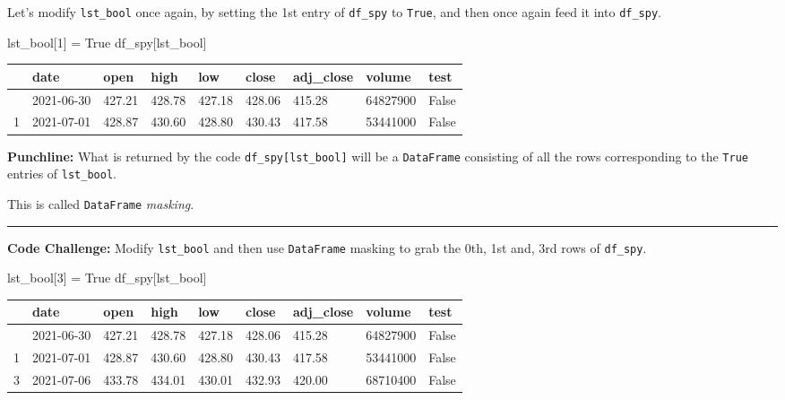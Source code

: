 \documentclass[
  letterpaper,
  DIV=11,
  numbers=noendperiod]{scrreprt}
\newenvironment{Shaded}{\begin{snugshade}}{\end{snugshade}}
\newcommand{\DecValTok}[1]{\textcolor[rgb]{0.68,0.00,0.00}{#1}}
\newcommand{\NormalTok}[1]{\textcolor[rgb]{0.00,0.23,0.31}{#1}}
\newcommand{\OperatorTok}[1]{\textcolor[rgb]{0.37,0.37,0.37}{#1}}
\newcommand{\VariableTok}[1]{\textcolor[rgb]{0.07,0.07,0.07}{#1}}
\begin{document}
Let's modify \texttt{lst\_bool} once again, by setting the 1st entry of
\texttt{df\_spy} to \texttt{True}, and then once again feed it into
\texttt{df\_spy}.

\begin{Shaded}
\begin{Highlighting}[]
\NormalTok{lst\_bool[}\DecValTok{1}\NormalTok{] }\OperatorTok{=} \VariableTok{True}
\NormalTok{df\_spy[lst\_bool]}
\end{Highlighting}
\end{Shaded}

\begin{longtable}[]{@{}lllllllll@{}}
\toprule\noalign{}
& date & open & high & low & close & adj\_close & volume & test \\
\midrule\noalign{}
\endhead
\bottomrule\noalign{}
\endlastfoot
0 & 2021-06-30 & 427.21 & 428.78 & 427.18 & 428.06 & 415.28 & 64827900 &
False \\
1 & 2021-07-01 & 428.87 & 430.60 & 428.80 & 430.43 & 417.58 & 53441000 &
False \\
\end{longtable}

\textbf{Punchline:} What is returned by the code
\texttt{df\_spy{[}lst\_bool{]}} will be a \texttt{DataFrame} consisting
of all the rows corresponding to the \texttt{True} entries of
\texttt{lst\_bool}.

This is called \texttt{DataFrame} \emph{masking}.

\begin{center}\rule{0.5\linewidth}{0.5pt}\end{center}

\textbf{Code Challenge:} Modify \texttt{lst\_bool} and then use
\texttt{DataFrame} masking to grab the 0th, 1st and, 3rd rows of
\texttt{df\_spy}.

\begin{Shaded}
\begin{Highlighting}[]
\NormalTok{lst\_bool[}\DecValTok{3}\NormalTok{] }\OperatorTok{=} \VariableTok{True}
\NormalTok{df\_spy[lst\_bool]}
\end{Highlighting}
\end{Shaded}

\begin{longtable}[]{@{}lllllllll@{}}
\toprule\noalign{}
& date & open & high & low & close & adj\_close & volume & test \\
\midrule\noalign{}
\endhead
\bottomrule\noalign{}
\endlastfoot
0 & 2021-06-30 & 427.21 & 428.78 & 427.18 & 428.06 & 415.28 & 64827900 &
False \\
1 & 2021-07-01 & 428.87 & 430.60 & 428.80 & 430.43 & 417.58 & 53441000 &
False \\
3 & 2021-07-06 & 433.78 & 434.01 & 430.01 & 432.93 & 420.00 & 68710400 &
False \\
\end{longtable}
\end{document}
